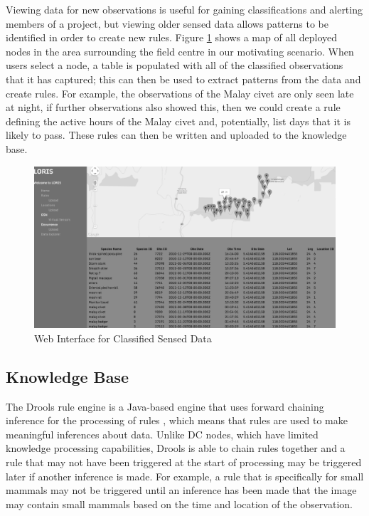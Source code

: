 		Viewing data for new observations is useful for gaining classifications and alerting members of a project, but viewing older sensed data allows patterns to be identified in order to create new rules. Figure \ref{kc:loris_data} shows a map of all deployed nodes in the area surrounding the field centre in our motivating scenario. When users select a node, a table is populated with all of the classified observations that it has captured; this can then be used to extract patterns from the data and create rules. For example, the \DIFdelbegin {}\DIFdelend \DIFaddbegin {}\DIFaddend observations of the Malay civet are only seen late at night, if further observations also showed this, then we could create a rule defining the active hours of the Malay civet and, potentially, list days that it is likely to pass. These rules can then be written and uploaded to the knowledge base.
		\begin{figure}[h]
		\centering
		\includegraphics[width=\textwidth]{Chap4/figures/loris_data}
		\caption{Web Interface for Classified Sensed Data}
		\label{kc:loris_data}
		\end{figure}

	\subsection{Knowledge Base}\label{arch:kb}
	The Drools rule engine is a Java-based engine that uses forward chaining inference for the processing of rules \cite{proctor2005drools}, which means that rules are used to make meaningful inferences about data. Unlike DC nodes, which have limited knowledge processing capabilities, Drools is able to chain rules together and a rule that may not have been triggered at the start of processing may be triggered later if another inference is made. For example, a rule that is specifically for small mammals may not be triggered until an inference has been made that the image may contain small mammals based on the time and location of the observation.

